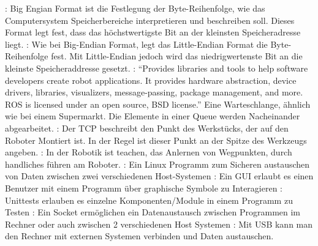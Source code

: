 \begin{acronym}
 : Big Engian Format ist die Festlegung der Byte-Reihenfolge, wie das Computersystem Speicherbereiche interpretieren und beschreiben soll. Dieses Format legt fest, dass das höchstwertigste Bit an der kleinsten Speicheradresse liegt.
 : Wie bei \acs{Big-Endian Format}, legt das Little-Endian Format die Byte-Reihenfolge fest. Mit Little-Endian jedoch wird das niedrigwertenste Bit an die kleinste Speicheraddresse gesetzt.
 : ``Provides libraries and tools to help software developers create robot applications. It provides hardware abstraction, device drivers, libraries, visualizers, message-passing, package management, and more. ROS is licensed under an open source, BSD license.'' \cite{ROSPR-2013}
  Eine Warteschlange, ähnlich wie bei einem Supermarkt. Die Elemente in einer Queue werden Nacheinander abgearbeitet. 
 : Der TCP beschreibt den Punkt des Werkstücks, der auf den Roboter Montiert ist. In der Regel ist dieser Punkt an der Spitze des Werkzeugs angeben.
 : In der Robotik ist teachen, das Anlernen von Wegpunkten, durch handliches führen am Roboter.
 : Ein Linux Programm zum Sicheren austauschen von Daten zwischen zwei verschiedenen Host-Systemen
 : Ein GUI erlaubt es einen Benutzer mit einem Programm über graphische Symbole zu Interagieren
 : Unittests erlauben es einzelne Komponenten/Module in einem Programm zu Testen
 : Ein Socket ermöglichen ein Datenaustausch zwischen Programmen im Rechner oder auch zwischen 2 verschiedenen Host Systemen
 : Mit USB kann man den Rechner mit externen Systemen verbinden und Daten austauschen.
\end{acronym}
